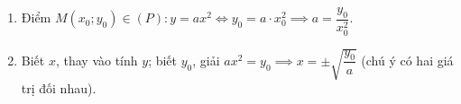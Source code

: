 \begin{enumerate}
\item Điểm $M(x_0; y_0) \in (P)\colon y = ax^2 \iff y_0 = a \cdot x_0^2 \implies \boxed{a = \dfrac{y_0}{x_0^2}}$.
\item Biết $x$, thay vào tính $y$; biết $y_0$, giải $ax^2 = y_0 \implies x = \pm\sqrt{\dfrac{y_0}{a}}$ (chú ý có hai giá trị đối nhau).
\end{enumerate}

